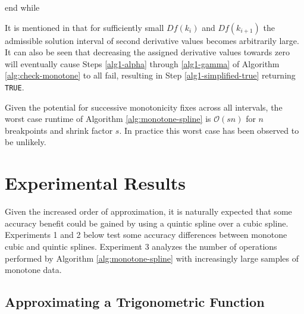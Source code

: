 \documentclass{scspaperproc}
\theoremstyle{scsthe}
\begin{document}
{       \label{step:changed}
    \item {}
       \label{step:requeue}
      end while
}

It is mentioned in  that for sufficiently small $Df(k_i)$ and $Df(k_{i+1})$ the admissible solution interval of second derivative values becomes arbitrarily large. It can also be seen that decreasing the assigned derivative values towards zero will eventually cause Steps \ref{alg1-alpha} through \ref{alg1-gamma} of Algorithm \ref{alg:check-monotone} to all fail, resulting in Step \ref{alg1-simplified-true} returning \texttt{TRUE}.

Given the potential for successive monotonicity fixes across all intervals, the worst case runtime of Algorithm \ref{alg:monotone-spline} is $\mathcal{O}(s n)$ for $n$ breakpoints and shrink factor $s$. In practice this worst case has been observed to be unlikely.

\section{Experimental Results}
\label{sec:results}

Given the increased order of approximation, it is naturally expected that some accuracy benefit could be gained by using a quintic spline over a cubic spline. Experiments 1 and 2 below test some accuracy differences between monotone cubic and quintic splines. Experiment 3 analyzes the number of operations performed by Algorithm \ref{alg:monotone-spline} with increasingly large samples of monotone data.

\subsection{Approximating a Trigonometric Function}
\end{document}
